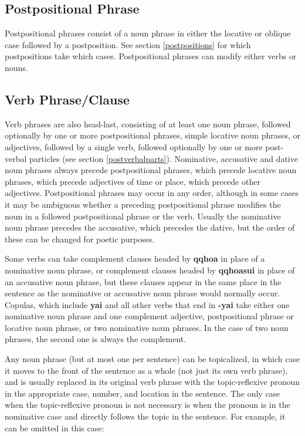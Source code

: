 \documentclass{article}
\begin{document}
\subsection{Postpositional Phrase}

Postpositional phrases consist of a noun phrase in either the locative or oblique case followed by a postposition. See section \ref{postpositions} for which postpositions take which cases. Postpositional phrases can modify either verbs or nouns.

\subsection{Verb Phrase/Clause}
\label{verbphrase}

Verb phrases are also head-last, consisting of at least one noun phrase, followed optionally by one or more postpositional phrases, simple locative noun phrases, or adjectives, followed by a single verb, followed optionally by one or more post-verbal particles (see section \ref{postverbalparts}). Nominative, accusative and dative noun phrases always precede postpositional phrases, which precede locative noun phrases, which precede adjectives of time or place, which precede other adjectives. Postpositional phrases may occur in any order, although in some cases it may be ambiguous whether a preceding postpositional phrase modifies the noun in a followed postpositional phrase or the verb.  Usually the nominative noun phrase precedes the accusative, which precedes the dative, but the order of these can be changed for poetic purposes.

Some verbs can take complement clauses headed by \textbf{qqhoa} in place of a nominative noun phrase, or complement clauses headed by \textbf{qqhoasui} in place of an accusative noun phrase, but these clauses appear in the same place in the sentence as the nominative or accusative noun phrase would normally occur. Copulas, which include \textbf{yai} and all other verbs that end in \textbf{-yai} take either one nominative noun phrase and one complement adjective, postpositional phrase or locative noun phrase, or two nominative noun phrases. In the case of two noun phrases, the second one is always the complement.

Any noun phrase (but at most one per sentence) can be topicalized, in which case it moves to the front of the sentence as a whole (not just its own verb phrase), and is usually replaced in its original verb phrase with the topic-reflexive pronoun in the appropriate case, number, and location in the sentence. The only case when the topic-reflexive pronoun is not necessary is when the pronoun is in the nominative case and directly follows the topic in the sentence. For example, it can be omitted in this case:
\end{document}
